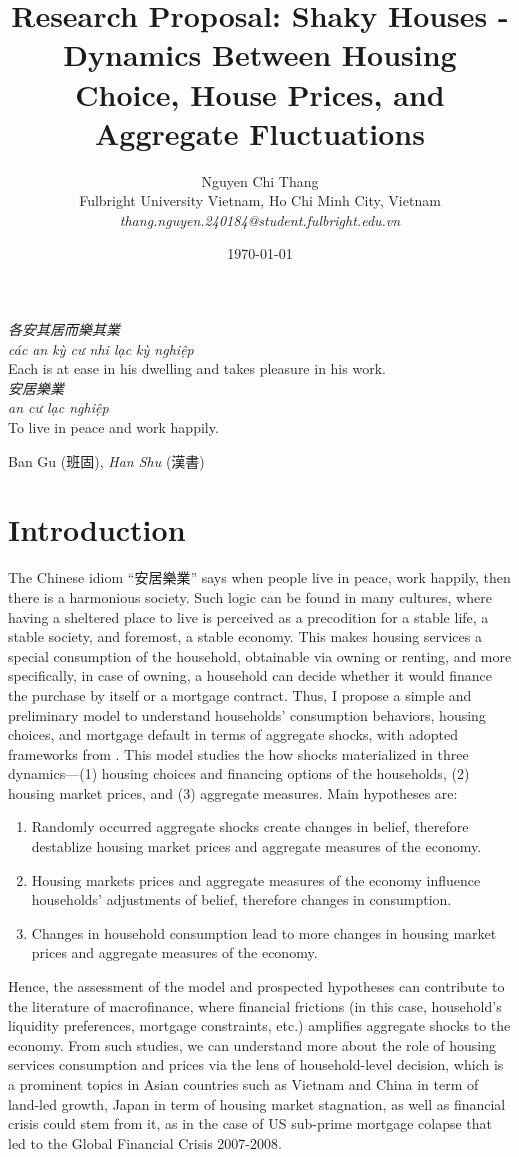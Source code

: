 \documentclass{style/fulbright}
\title{Research Proposal: Shaky Houses - Dynamics Between Housing Choice, House Prices, and Aggregate Fluctuations}
\author{Nguyen Chi Thang \\
  \small{Fulbright University Vietnam, Ho Chi Minh City, Vietnam \\
         \textit{thang.nguyen.240184@student.fulbright.edu.vn}}}
\date{\today}
\begin{document}
\maketitle

\epigraph{%
  \textit{各安其居而樂其業} \\
  \textit{các an kỳ cư nhi lạc kỳ nghiệp} \\
  Each is at ease in his dwelling and takes pleasure in his work.
  \\[1.2ex]
  \textit{安居樂業} \\
  \textit{an cư lạc nghiệp} \\
  To live in peace and work happily.%
}{Ban Gu (班固), \textit{Han Shu} (漢書)}

\section{Introduction}
The Chinese idiom “安居樂業” says when people live in peace, work happily, then there is a harmonious society. Such logic can be found in many cultures, where having a sheltered place to live is perceived as a precodition for a stable life, a stable society, and foremost, a stable economy. This makes housing services a special consumption of the household, obtainable via owning or renting, and more specifically, in case of owning, a household can decide whether it would finance the purchase by itself or a mortgage contract. Thus, I propose a simple and preliminary model to understand households' consumption behaviors, housing choices, and mortgage default in terms of aggregate shocks, with adopted frameworks from . This model studies the how shocks materialized in three dynamics—(1) housing choices and financing options of the households, (2) housing market prices, and (3) aggregate measures. Main hypotheses are: \begin{enumerate}
  \item Randomly occurred aggregate shocks create changes in belief, therefore destablize housing market prices and aggregate measures of the economy.
  \item Housing markets prices and aggregate measures of the economy influence households' adjustments of belief, therefore changes in consumption.
  \item Changes in household consumption lead to more changes in housing market prices and aggregate measures of the economy.
\end{enumerate}
Hence, the assessment of the model and prospected hypotheses can contribute to the literature of macrofinance, where financial frictions (in this case, household's liquidity preferences,  mortgage constraints, etc.) amplifies aggregate shocks to the economy. From such studies, we can understand more about the role of housing services consumption and prices via the lens of household-level decision, which is a prominent topics in Asian countries such as Vietnam and China in term of land-led growth, Japan in term of housing market stagnation, as well as financial crisis could stem from it, as in the case of US sub-prime mortgage colapse that led to the Global Financial Crisis 2007-2008. 
\end{document}
